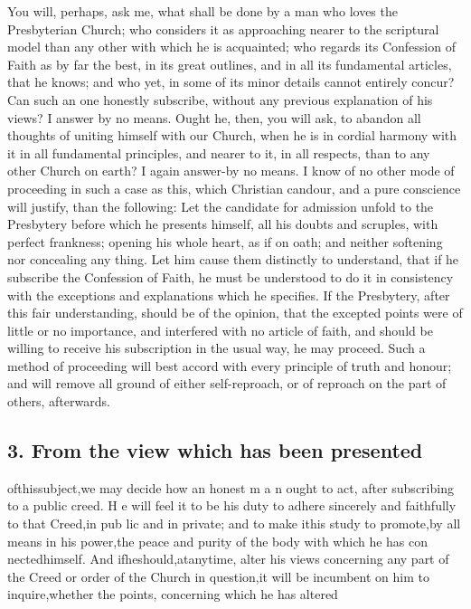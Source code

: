 \documentclass[
]{book}
\begin{document}
You will, perhaps, ask me, what shall be done by a man who loves the Presbyterian Church; who considers it as approaching nearer to the scriptural model than any other with which he is acquainted; who regards its Confession of Faith as by far the best, in its great outlines, and in all its fundamental articles, that he knows; and who yet, in some of its minor details cannot entirely concur? Can such an one honestly subscribe, without any previous explanation of his views? I answer by no means. Ought he, then, you will ask, to abandon all thoughts of uniting himself with our Church, when he is in cordial harmony with it in all fundamental principles, and nearer to it, in all respects, than to any other Church on earth? I again answer-by no means. I know of no other mode of proceeding in such a case as this, which Christian candour, and a pure conscience will justify, than the following: Let the candidate for admission unfold to the Presbytery before which he presents himself, all his doubts and scruples, with perfect frankness; opening his whole heart, as if on oath; and neither softening nor concealing any thing. Let him cause them distinctly to understand, that if he subscribe the Confession of Faith, he must be understood to do it in consistency with the exceptions and explanations which he specifies. If the Presbytery, after this fair understanding, should be of the opinion, that the excepted points were of little or no importance, and interfered with no article of faith, and should be willing to receive his subscription in the usual way, he may proceed. Such a method of proceeding will best accord with every principle of truth and honour; and will remove all ground of either self-reproach, or of reproach on the part of others, afterwards.

\hypertarget{from-the-view-which-has-been-presented}{%
\subsection{3. From the view which has been presented}\label{from-the-view-which-has-been-presented}}

ofthissubject,we may decide how an honest m a n ought to act, after subscribing to a public creed. H e will feel it to be his duty to adhere
sincerely and faithfully to that Creed,in pub
lic and in private; and to make ithis study to
promote,by all means in his power,the peace
and purity of the body with which he has con nectedhimself. And ifheshould,atanytime,
alter his views concerning any part of the Creed or order of the Church in question,it
will be incumbent on him to inquire,whether the points, concerning which he has altered
\end{document}
